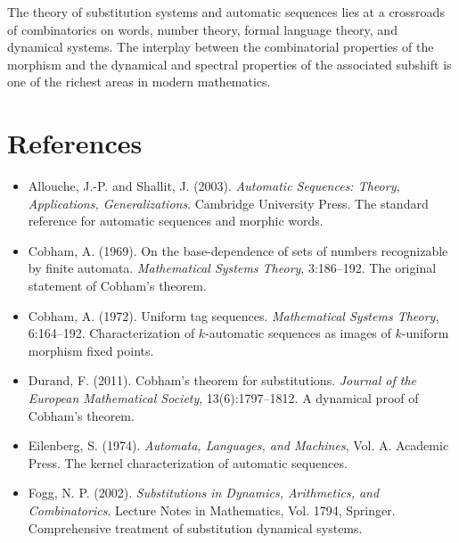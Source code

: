 The theory of substitution systems and automatic sequences lies at a crossroads of combinatorics on words, number theory, formal language theory, and dynamical systems. The interplay between the combinatorial properties of the morphism and the dynamical and spectral properties of the associated subshift is one of the richest areas in modern mathematics.



\section{References}

\begin{itemize}
\item Allouche, J.-P. and Shallit, J. (2003). \textit{Automatic Sequences: Theory, Applications, Generalizations}. Cambridge University Press. The standard reference for automatic sequences and morphic words.
\end{itemize}

\begin{itemize}
\item Cobham, A. (1969). On the base-dependence of sets of numbers recognizable by finite automata. \textit{Mathematical Systems Theory}, 3:186--192. The original statement of Cobham's theorem.
\end{itemize}

\begin{itemize}
\item Cobham, A. (1972). Uniform tag sequences. \textit{Mathematical Systems Theory}, 6:164--192. Characterization of $k$-automatic sequences as images of $k$-uniform morphism fixed points.
\end{itemize}

\begin{itemize}
\item Durand, F. (2011). Cobham's theorem for substitutions. \textit{Journal of the European Mathematical Society}, 13(6):1797--1812. A dynamical proof of Cobham's theorem.
\end{itemize}

\begin{itemize}
\item Eilenberg, S. (1974). \textit{Automata, Languages, and Machines}, Vol. A. Academic Press. The kernel characterization of automatic sequences.
\end{itemize}

\begin{itemize}
\item Fogg, N. P. (2002). \textit{Substitutions in Dynamics, Arithmetics, and Combinatorics}. Lecture Notes in Mathematics, Vol. 1794, Springer. Comprehensive treatment of substitution dynamical systems.
\end{itemize}

